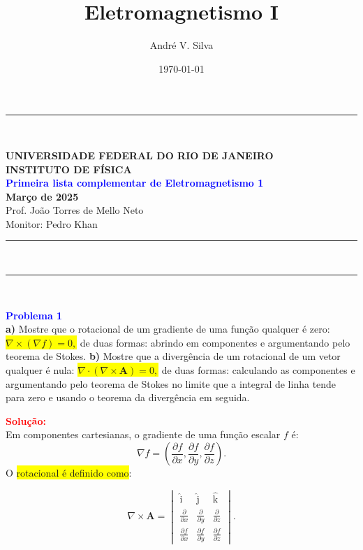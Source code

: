 \documentclass[a4paper,12pt]{article}
\title{ \textbf{\large Eletromagnetismo I }}
\author{Andr\'e V. Silva}
\date{\today}
\begin{document}
\noindent\rule{\linewidth}{0.8pt}\\
\begin{center}
    \textbf{UNIVERSIDADE FEDERAL DO RIO DE JANEIRO}\\
    \textbf{INSTITUTO DE FÍSICA}\\
    \textbf{\textcolor{blue}{Primeira lista complementar de Eletromagnetismo 1}}\\
    \textbf{Março de 2025}\\
    \vspace{0.5cm}
    Prof. João Torres de Mello Neto\\
    Monitor: Pedro Khan
\end{center}
\noindent\rule{\linewidth}{0.8pt}\\
\maketitle


\noindent\rule{\linewidth}{0.4pt}\\

\justifying

\begin{flushleft}
\textbf{\textcolor{blue}{\Large Problema 1}}\\
\textbf{a)} Mostre que o rotacional de um gradiente de uma função qualquer é zero:
\colorbox{yellow}{$\nabla \times (\nabla f) = 0,$} de duas formas: abrindo em componentes e 
argumentando pelo teorema de Stokes. 
\textbf{b)} Mostre que a divergência de um rotacional de um vetor qualquer é nula:
\colorbox{yellow}{$\nabla \cdot (\nabla \times \mathbf{A}) = 0,$} de duas formas: calculando as 
componentes e argumentando pelo teorema de Stokes no limite que a integral de 
linha tende para zero e usando o teorema da divergência em seguida.
\end{flushleft}

\textcolor{red}{\textbf{Solução:}}\\

Em componentes cartesianas, o gradiente de uma função escalar $f$ é:
\begin{equation}
    \nabla f = \left( \frac{\partial f}{\partial x}, \frac{\partial f}{\partial y}, \frac{\partial f}{\partial z} \right).
\end{equation}
O \colorbox{yellow}{rotacional é definido como}:

\begin{equation}
    \nabla \times \mathbf{A} = 
    \begin{vmatrix} 
        \hat{\textrm{i}} & \hat{\textrm{j}} & \hat{\textrm{k}} \\
        \frac{\partial}{\partial x} & \frac{\partial}{\partial y} & \frac{\partial}{\partial z} \\
        \frac{\partial f}{\partial x} & \frac{\partial f}{\partial y} & \frac{\partial f}{\partial z} 
    \end{vmatrix}.
\end{equation}
\end{document}
